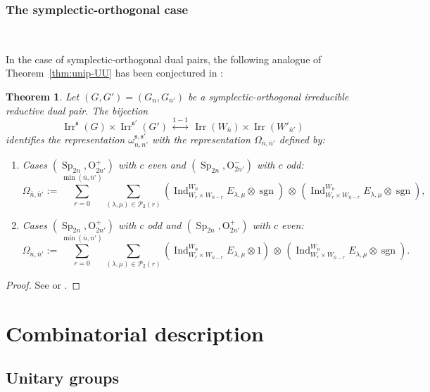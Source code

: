 \documentclass[12pt]{amsart}
\numberwithin{equation}{subsection}
\newtheorem{thm}[equation]{Theorem}
\newcommand{\cP}{\mathcal{P}}
\newcommand{\sgn}{\operatorname{sgn}}
\newcommand{\Ind}{\operatorname{Ind}}
\newcommand{\fs}{\mathfrak{s}}
\newcommand{\Irr}{\operatorname{Irr}}
\newcommand{\Sp}{\operatorname{Sp}}
\def\rO{{\mathrm{O}}}
\begin{document}
\subsubsection{The  symplectic-orthogonal case}\

In the case of symplectic-orthogonal dual pairs, the following  analogue of Theorem~\ref{thm:unip-UU} has been conjectured in \cite[Conjecture~3.11]{AMR}:
\begin{thm} \label{thm:AMRconj}
Let $(G,G')=(G_n,G_{n'})$ be a symplectic-orthogonal irreducible reductive dual pair. 
The bijection 
\[\Irr^\fs(G)\times\Irr^{\fs'}(G')\,\overset{1-1}{\longleftrightarrow}\, \Irr(W_{\overline{n}})\times \Irr(W'_{\overline{n}'})\]
identifies the representation $\omega_{n,n'}^{\fs,\fs'}$ with the representation $\Omega_{\overline{n},\overline{n}'}$ defined by:
\begin{enumerate}
\item Cases $(\Sp_{2n},\rO^+_{2n'})$ with $c$ even and $(\Sp_{2n},\rO^-_{2n'})$ with $c$ odd: 
\[\Omega_{\overline{n},\overline{n}'}:=\sum_{r=0}^{\min(\overline{n},\overline{n}')}\sum_{(\lambda,\mu)\in\cP_2(r)}
\left(\Ind_{W_r\times W_{\overline{n}-r}}^{W_{\overline{n}}}E_{\lambda,\mu}\otimes\sgn\right)\,\otimes\,
\left(\Ind_{W_r\times W_{\overline{n}-r}}^{W_{\overline{n}}} E_{\lambda,\mu}\otimes\sgn\right),\]
\item Cases $(\Sp_{2n},\rO^+_{2n'})$ with $c$ odd and $(\Sp_{2n},\rO^+_{2n'})$ with $c$ even: 
\[\Omega_{\overline{n},\overline{n}'}:=\sum_{r=0}^{\min(\overline{n},\overline{n}')}\sum_{(\lambda,\mu)\in\cP_2(r)}
\left(\Ind_{W_r\times W_{\overline{n}-r}}^{W_{\overline{n}}}E_{\lambda,\mu}\otimes 1\right)\,\otimes\,
\left(\Ind_{W_r\times W_{\overline{n}-r}}^{W_{\overline{n}}}E_{\lambda,\mu}\otimes \sgn \right).\]
\end{enumerate} 
\end{thm}
\begin{proof}
See \cite[Theorem 1.8 and Proposition 3.9]{PanAJM} or \cite[Theorem 1.4]{MQZ}.
\end{proof}

\section{Combinatorial description} \label{sec:combi}

\subsection{Unitary groups} \label{sec:unitary}\
\end{document}
